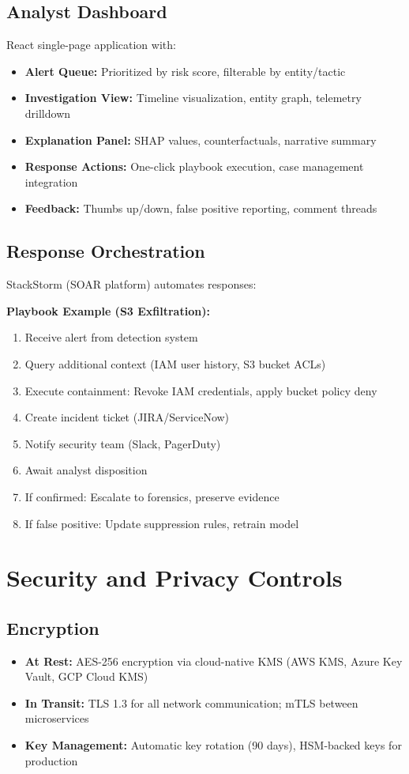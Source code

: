\subsection{Analyst Dashboard}
React single-page application with:
\begin{itemize}
    \item \textbf{Alert Queue:} Prioritized by risk score, filterable by entity/tactic
    \item \textbf{Investigation View:} Timeline visualization, entity graph, telemetry drilldown
    \item \textbf{Explanation Panel:} SHAP values, counterfactuals, narrative summary
    \item \textbf{Response Actions:} One-click playbook execution, case management integration
    \item \textbf{Feedback:} Thumbs up/down, false positive reporting, comment threads
\end{itemize}

\subsection{Response Orchestration}
StackStorm (SOAR platform) automates responses:

\textbf{Playbook Example (S3 Exfiltration):}
\begin{enumerate}
    \item Receive alert from detection system
    \item Query additional context (IAM user history, S3 bucket ACLs)
    \item Execute containment: Revoke IAM credentials, apply bucket policy deny
    \item Create incident ticket (JIRA/ServiceNow)
    \item Notify security team (Slack, PagerDuty)
    \item Await analyst disposition
    \item If confirmed: Escalate to forensics, preserve evidence
    \item If false positive: Update suppression rules, retrain model
\end{enumerate}

\section{Security and Privacy Controls}\label{sec:arch-security}
\subsection{Encryption}
\begin{itemize}
    \item \textbf{At Rest:} AES-256 encryption via cloud-native KMS (AWS KMS, Azure Key Vault, GCP Cloud KMS)
    \item \textbf{In Transit:} TLS 1.3 for all network communication; mTLS between microservices
    \item \textbf{Key Management:} Automatic key rotation (90 days), HSM-backed keys for production
\end{itemize}

